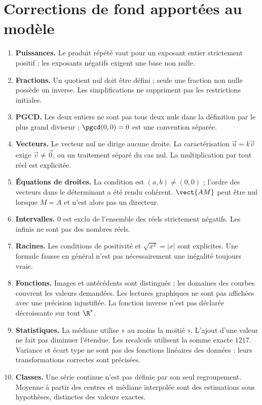 \clearpage\section*{Corrections de fond apportées au modèle}
\begin{enumerate}
\item \textbf{Puissances.} Le produit répété vaut pour un exposant entier strictement positif ; les exposants négatifs exigent une base non nulle.
\item \textbf{Fractions.} Un quotient nul doit être défini ; seule une fraction non nulle possède un inverse. Les simplifications ne suppriment pas les restrictions initiales.
\item \textbf{PGCD.} Les deux entiers ne sont pas tous deux nuls dans la définition par le plus grand diviseur ; $\pgcd(0,0)=0$ est une convention séparée.
\item \textbf{Vecteurs.} Le vecteur nul ne dirige aucune droite. La caractérisation $\vec u=k\vec v$ exige $\vec v\ne\vec0$, ou un traitement séparé du cas nul. La multiplication par tout réel est explicitée.
\item \textbf{Équations de droites.} La condition est $(a,b)\ne(0,0)$ ; l'ordre des vecteurs dans le déterminant a été rendu cohérent. $\vect{AM}$ peut être nul lorsque $M=A$ et n'est alors pas un directeur.
\item \textbf{Intervalles.} $0$ est exclu de l'ensemble des réels strictement négatifs. Les infinis ne sont pas des nombres réels.
\item \textbf{Racines.} Les conditions de positivité et $\sqrt{x^2}=|x|$ sont explicites. Une formule fausse en général n'est pas nécessairement une inégalité toujours vraie.
\item \textbf{Fonctions.} Images et antécédents sont distingués ; les domaines des courbes couvrent les valeurs demandées. Les lectures graphiques ne sont pas affichées avec une précision injustifiée. La fonction inverse n'est pas déclarée décroissante sur tout $\R^*$.
\item \textbf{Statistiques.} La médiane utilise « au moins la moitié ». L'ajout d'une valeur ne fait pas diminuer l'étendue. Les recalculs utilisent la somme exacte $1217$. Variance et écart type ne sont pas des fonctions linéaires des données : leurs transformations correctes sont précisées.
\item \textbf{Classes.} Une série continue n'est pas définie par son seul regroupement. Moyenne à partir des centres et médiane interpolée sont des estimations sous hypothèses, distinctes des valeurs exactes.

\end{enumerate}
